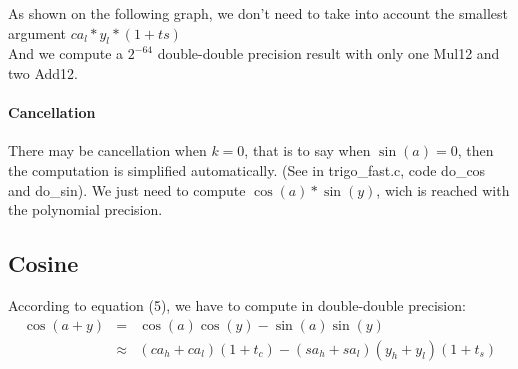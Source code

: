 As shown on the following graph, we don't need to take into account the smallest argument $ca_l * y_l * (1+ts)$\\
And we compute a $2^{-64}$ double-double precision result with only
one Mul12 and two Add12.
\begin{center}
 \small
 \setlength{\unitlength}{3ex}
  \end{center}

\paragraph{Cancellation}


There may be cancellation when $k = 0$, that is to say when $\sin(a) =
0$, then the computation is simplified automatically. (See in
trigo\_fast.c, code do\_cos and do\_sin).  We just need to compute
$\cos(a) * \sin(y)$, wich is reached with the polynomial precision. 

 

\subsection{Cosine}
According to equation (5), we have to compute in double-double precision:
 \begin{eqnarray*}
  \cos(a+y) &=& \cos(a) \cos(y)  - \sin(a)\sin(y)  \\
  & \approx& (ca_h+ca_l)(1+t_c) - (sa_h+sa_l)(y_h+y_l)(1+t_s)
\end{eqnarray*}


